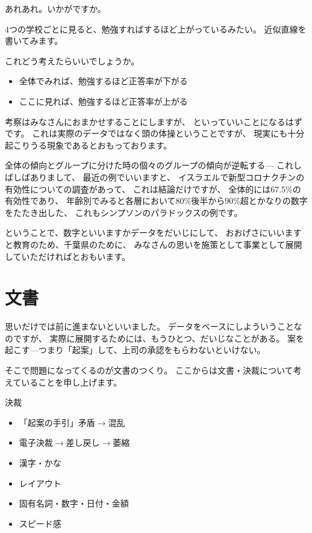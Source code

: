 \documentclass[uplatex,jis2004,dvipdfmx,12pt]{jsarticle}
\begin{document}
あれあれ。いかがですか。

4つの学校ごとに見ると、勉強すればするほど上がっているみたい。
近似直線を書いてみます。

これどう考えたらいいでしょうか。

\begin{itemize}
 \item 全体でみれば、勉強するほど正答率が下がる
 \item ここに見れば、勉強するほど正答率が上がる
\end{itemize}
考察はみなさんにおまかせすることにしますが、
といっていいことになるはずです。
これは実際のデータではなく頭の体操ということですが、
現実にも十分起こりうる現象であるとおもっております。

全体の傾向とグループに分けた時の個々のグループの傾向が逆転する---
これしばしばありまして、
最近の例でいいますと、
イスラエルで新型コロナクチンの有効性についての調査があって、
これは結論だけですが、
全体的には67.5\%の有効性であり、
年齢別でみると各層において80\%後半から90\%超とかなりの数字をたたき出した、
これもシンプソンのパラドックスの例です。

ということで、数字といいますかデータをだいじにして、
おおげさにいいますと教育のため、千葉県のために、
みなさんの思いを施策として事業として展開していただければとおもいます。


\section{文書}

思いだけでは前に進まないといいました。
データをベースにしよういうことなのですが、
実際に展開するためには、もうひとつ、だいじなことがある。
案を起こす---つまり「起案」して、上司の承認をもらわないといけない。

そこで問題になってくるのが文書のつくり。
ここからは文書・決裁について考えていることを申し上げます。




決裁
       \begin{itemize}
	\item 「起案の手引」矛盾$\longrightarrow${}混乱
	\item 電子決裁$\longrightarrow${}差し戻し$\longrightarrow${}萎縮
	\item 漢字・かな
	\item レイアウト
	\item 固有名詞・数字・日付・金額
	\item スピード感
   \end{itemize}
\fi
\end{document}
